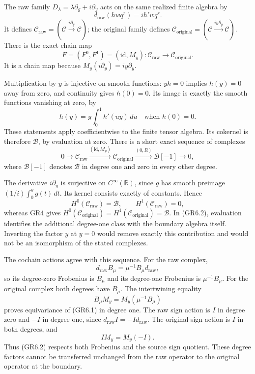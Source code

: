 The raw family \(D_\lambda=\lambda\partial_g+i\partial_y\) acts on the
same realized finite algebra by \[
d_{\mathrm{raw}}(h wq^r)=ih'wq^r.
\] It defines
\(\mathcal C_{\mathrm{raw}}=(\mathcal C\xrightarrow{i\partial_y}\mathcal C)\);
the original family defines
\(\mathcal C_{\mathrm{original}}=(\mathcal C\xrightarrow{iy\partial_y}\mathcal C)\).
There is the exact chain map \[
F=(F^0,F^1)=(\mathrm{id},M_y):
\mathcal C_{\mathrm{raw}}\longrightarrow
\mathcal C_{\mathrm{original}}.
\tag{GR6.1}
\] It is a chain map because \(M_y(i\partial_y)=iy\partial_y\).

Multiplication by \(y\) is injective on smooth functions: \(yh=0\)
implies \(h(y)=0\) away from zero, and continuity gives \(h(0)=0\). Its
image is exactly the smooth functions vanishing at zero, by \[
h(y)=y\int_0^1h'(uy)\,du\quad\text{when }h(0)=0.
\] These statements apply coefficientwise to the finite tensor algebra.
Its cokernel is therefore \(\mathcal B\), by evaluation at zero. There
is a short exact sequence of complexes \[
0\longrightarrow\mathcal C_{\mathrm{raw}}
\xrightarrow{(\mathrm{id},M_y)}
\mathcal C_{\mathrm{original}}
\xrightarrow{(0,R)}
\mathcal B[-1]\longrightarrow0,
\tag{GR6.2}
\] where \(\mathcal B[-1]\) denotes \(\mathcal B\) in degree one and
zero in every other degree.

The derivative \(i\partial_y\) is surjective on \(C^\infty(\mathbb R)\),
since \(g\) has smooth preimage \((1/i)\int_0^y g(t)\,dt\). Its kernel
consists exactly of constants. Hence \[
H^0(\mathcal C_{\mathrm{raw}})=\mathcal B,\qquad
H^1(\mathcal C_{\mathrm{raw}})=0,
\] whereas GR4 gives
\(H^0(\mathcal C_{\mathrm{original}})=H^1(\mathcal C_{\mathrm{original}})=\mathcal B\).
In (GR6.2), evaluation identifies the additional degree-one class with
the boundary algebra itself. Inverting the factor \(y\) at \(y=0\) would
remove exactly this contribution and would not be an isomorphism of the
stated complexes.

The cochain actions agree with this sequence. For the raw complex, \[
d_{\mathrm{raw}}B_\mu=\mu^{-1}B_\mu d_{\mathrm{raw}},
\] so its degree-zero Frobenius is \(B_\mu\) and its degree-one
Frobenius is \(\mu^{-1}B_\mu\). For the original complex both degrees
have \(B_\mu\). The intertwining equality \[
B_\mu M_y=M_y(\mu^{-1}B_\mu)
\tag{GR6.3}
\] proves equivariance of (GR6.1) in degree one. The raw sign action is
\(I\) in degree zero and \(-I\) in degree one, since
\(d_{\mathrm{raw}}I=-Id_{\mathrm{raw}}\). The original sign action is
\(I\) in both degrees, and \[
IM_y=M_y(-I).
\tag{GR6.4}
\] Thus (GR6.2) respects both Frobenius and the source sign quotient.
These degree factors cannot be transferred unchanged from the raw
operator to the original operator at the boundary.

